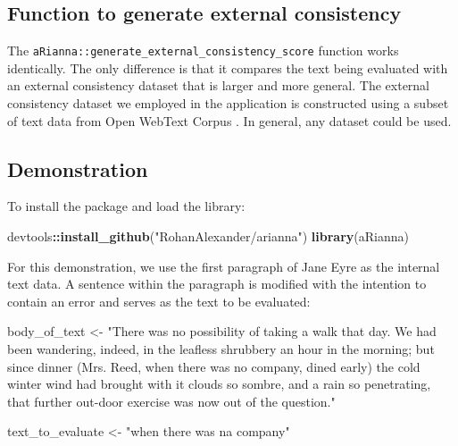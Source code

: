 \documentclass[11pt,]{article}
\newenvironment{Shaded}{\begin{snugshade}}{\end{snugshade}}
\newcommand{\KeywordTok}[1]{\textcolor[rgb]{0.13,0.29,0.53}{\textbf{#1}}}
\newcommand{\NormalTok}[1]{#1}
\newcommand{\OperatorTok}[1]{\textcolor[rgb]{0.81,0.36,0.00}{\textbf{#1}}}
\newcommand{\StringTok}[1]{\textcolor[rgb]{0.31,0.60,0.02}{#1}}
\begin{document}
\hypertarget{function-to-generate-external-consistency}{%
\subsection{Function to generate external consistency}\label{function-to-generate-external-consistency}}

The \texttt{aRianna::generate\_external\_consistency\_score} function works identically. The only difference is that it compares the text being evaluated with an external consistency dataset that is larger and more general. The external consistency dataset we employed in the application is constructed using a subset of text data from Open WebText Corpus \citep{Gokaslan2019OpenWeb}. In general, any dataset could be used.

\hypertarget{demonstration}{%
\subsection{Demonstration}\label{demonstration}}

To install the package and load the library:

\begin{Shaded}
\begin{Highlighting}[]
\NormalTok{devtools}\OperatorTok{::}\KeywordTok{install_github}\NormalTok{(}\StringTok{"RohanAlexander/arianna"}\NormalTok{)}
\KeywordTok{library}\NormalTok{(aRianna)}
\end{Highlighting}
\end{Shaded}

For this demonstration, we use the first paragraph of Jane Eyre as the internal text data. A sentence within the paragraph is modified with the intention to contain an error and serves as the text to be evaluated:

\begin{Shaded}
\begin{Highlighting}[]
\NormalTok{body_of_text <-}\StringTok{ "There was no possibility of taking a walk that day. }
\StringTok{  We had been wandering, indeed, in the leafless shrubbery an hour in }
\StringTok{  the morning; but since dinner (Mrs. Reed, when there was no company, }
\StringTok{  dined early) the cold winter wind had brought with it clouds so sombre, }
\StringTok{  and a rain so penetrating, that further out-door exercise was now out }
\StringTok{  of the question."}

\NormalTok{text_to_evaluate <-}\StringTok{ "when there was na company"}
\end{Highlighting}
\end{Shaded}
\end{document}
